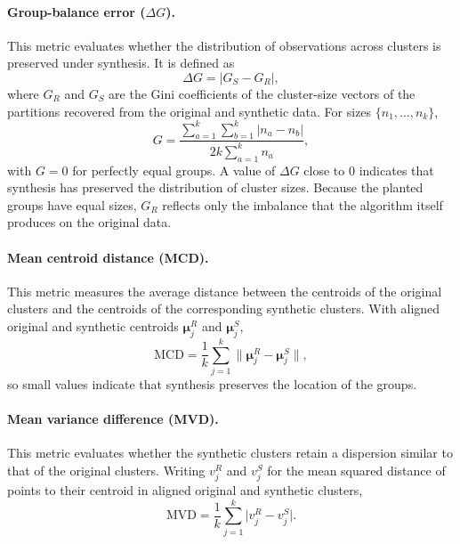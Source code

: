 \documentclass[pdflatex,referee]{sn-jnl}
\newcommand{\bmu}{\boldsymbol{\mu}}
\begin{document}
\paragraph{Group-balance error ($\Delta G$).}
This metric evaluates whether the distribution of observations across clusters
is preserved under synthesis. It is defined as
\begin{equation}
  \Delta G = \bigl| G_S - G_R \bigr|,
  \label{eq:dgini}
\end{equation}
where $G_R$ and $G_S$ are the Gini coefficients of the cluster-size vectors of
the partitions recovered from the original and synthetic data. For sizes
$\{n_1,\dots,n_k\}$,
\begin{equation}
  G = \frac{\sum_{a=1}^{k}\sum_{b=1}^{k} |n_a - n_b|}
           {2k \sum_{a=1}^{k} n_a},
  \label{eq:gini}
\end{equation}
with $G = 0$ for perfectly equal groups. A value of $\Delta G$ close to $0$
indicates that synthesis has preserved the distribution of cluster sizes.
Because the planted groups have equal sizes, $G_R$ reflects only the imbalance
that the algorithm itself produces on the original data.

\paragraph{Mean centroid distance (MCD).}
This metric measures the average distance between the centroids of the
original clusters and the centroids of the corresponding synthetic clusters.
With aligned original and synthetic centroids $\bmu_j^R$ and $\bmu_j^S$,
\begin{equation}
  \mathrm{MCD} = \frac{1}{k} \sum_{j=1}^{k}
    \bigl\lVert \bmu_j^R - \bmu_j^S \bigr\rVert ,
  \label{eq:mcd}
\end{equation}
so small values indicate that synthesis preserves the location of the groups.

\paragraph{Mean variance difference (MVD).}
This metric evaluates whether the synthetic clusters retain a dispersion
similar to that of the original clusters. Writing $v_j^R$ and $v_j^S$ for the
mean squared distance of points to their centroid in aligned original and
synthetic clusters,
\begin{equation}
  \mathrm{MVD} = \frac{1}{k} \sum_{j=1}^{k} \bigl| v_j^R - v_j^S \bigr| .
  \label{eq:mvd}
\end{equation}
\end{document}
